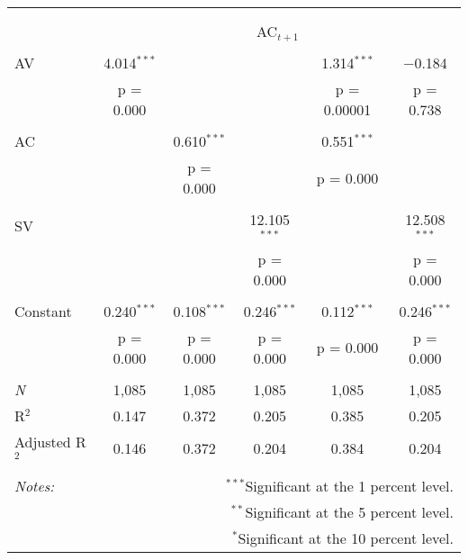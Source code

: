 
\begin{tabular}{@{\extracolsep{5pt}}lccccc} 
\\[-1.8ex]\hline 
\hline \\[-1.8ex] 
\\[-1.8ex] & \multicolumn{5}{c}{AC$_{t+1}$} \\ 
\hline \\[-1.8ex] 
 AV & 4.014$^{***}$ &  &  & 1.314$^{***}$ & $-$0.184 \\ 
  & p = 0.000 &  &  & p = 0.00001 & p = 0.738 \\ 
  & & & & & \\ 
 AC &  & 0.610$^{***}$ &  & 0.551$^{***}$ &  \\ 
  &  & p = 0.000 &  & p = 0.000 &  \\ 
  & & & & & \\ 
 SV &  &  & 12.105$^{***}$ &  & 12.508$^{***}$ \\ 
  &  &  & p = 0.000 &  & p = 0.000 \\ 
  & & & & & \\ 
 Constant & 0.240$^{***}$ & 0.108$^{***}$ & 0.246$^{***}$ & 0.112$^{***}$ & 0.246$^{***}$ \\ 
  & p = 0.000 & p = 0.000 & p = 0.000 & p = 0.000 & p = 0.000 \\ 
  & & & & & \\ 
\textit{N} & 1,085 & 1,085 & 1,085 & 1,085 & 1,085 \\ 
R$^{2}$ & 0.147 & 0.372 & 0.205 & 0.385 & 0.205 \\ 
Adjusted R$^{2}$ & 0.146 & 0.372 & 0.204 & 0.384 & 0.204 \\ 
\hline 
\hline \\[-1.8ex] 
\textit{Notes:} & \multicolumn{5}{r}{$^{***}$Significant at the 1 percent level.} \\ 
 & \multicolumn{5}{r}{$^{**}$Significant at the 5 percent level.} \\ 
 & \multicolumn{5}{r}{$^{*}$Significant at the 10 percent level.} \\ 
\end{tabular} 

